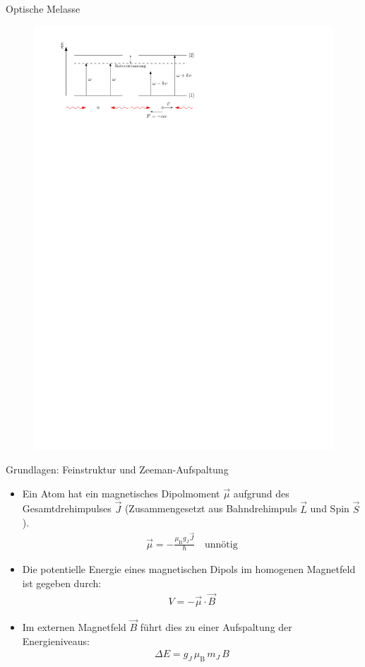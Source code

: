 \documentclass[12pt,xcolor=dvipsnames]{beamer}
\begin{document}
\begin{frame}{Optische Melasse}
\begin{figure}[h]
	\centering
	\includegraphics[width=\textwidth]{./figures/melasse.pdf}
\end{figure}
\end{frame}

\begin{frame}{Grundlagen: Feinstruktur und Zeeman-Aufspaltung}
	\begin{itemize}
		\item Ein Atom hat ein magnetisches Dipolmoment $\vec{\mu}$ aufgrund des Gesamtdrehimpulses $\vec{J}$ (Zusammengesetzt aus Bahndrehimpuls $\vec{L}$ und Spin $\vec{S}$).
		\begin{align}
		\vec{\mu} = - \frac{\mu_\mathrm{B} g_J \vec{J}}{\hbar} \quad \text{unnötig}
		\end{align}
		\item Die potentielle Energie eines magnetischen Dipols im homogenen Magnetfeld ist gegeben durch:
		\begin{align}
		V = - \vec{\mu} \cdot \vec{B}
		\end{align}
		\item Im externen Magnetfeld $\vec{B}$ führt dies zu einer Aufspaltung der Energieniveaus:
		\begin{align}
		\Delta E = g_J \, \mu_\mathrm{B} \, m_J \, B
		\end{align}
	\end{itemize}
\end{frame}
\end{document}
